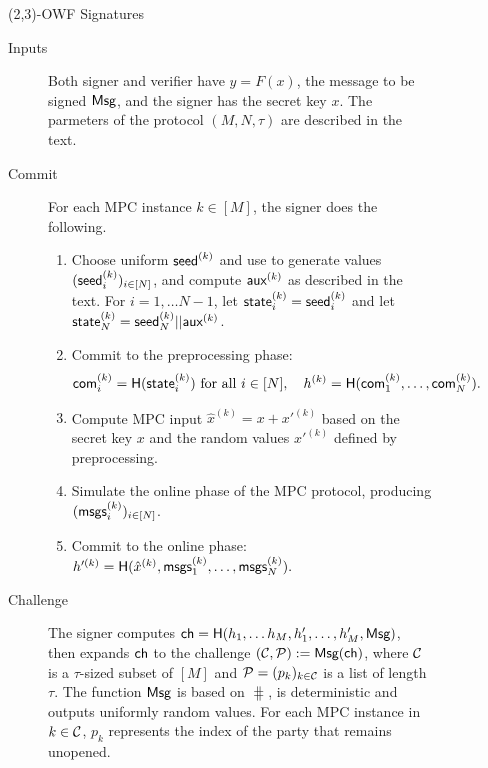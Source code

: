 \begin{figure}[p]
 \begin{minipage}[t]{1.1\textwidth}
 \begin{protocolbox}{(2,3)-OWF Signatures}
 \begin{description}
    \item[Inputs] Both signer and verifier have $y = F(x)$, the
        message to be signed $\textsf{Msg}$, and the signer has the secret key $x$.  The
            parmeters of the protocol $(M, N, \tau)$ are described in the text.
    \item[Commit] For each MPC instance $k\in[M]$, the signer does the following.
    \begin{enumerate}
        \item Choose uniform $\textsf{seed}^{(k)}$ and use  to generate values $(\textsf{seed}^{(k)}_i)_{i \in [N]}$, and compute  
        $\textsf{aux}^{(k)}$ as described in the text. 
        For $i=1,\ldots N-1$, let $\textsf{state}^{(k)}_i = \textsf{seed}^{(k)}_i$ and  let $\textsf{state}^{(k)}_{N} = \textsf{seed}^{(k)}_{N} || \textsf{aux}^{(k)}$.
        \item Commit to the preprocessing phase:
        \begin{align*}
        \textsf{com}^{(k)}_{i} = \textsf{H}(\textsf{state}^{(k)}_i) \text{ for all } i\in [N], \quad 
        h^{(k)} = \textsf{H}(\textsf{com}^{(k)}_{1},\ldots,\textsf{com}^{(k)}_{N}).
        \end{align*}						
        \item Compute MPC input $\hat{x}^{(k)} = x + x'^{(k)}$ based on the secret key $x$ and the random values $x'^(k)$ defined by preprocessing.
        \item Simulate the online phase of the MPC protocol, producing $(\textsf{msgs}^{(k)}_i)_{i \in [N]}$.			
        \item Commit to the online phase:
        $
         h'^{(k)}= \textsf{H}(\hat{x}^{(k)}, \textsf{msgs}_{1}^{(k)}, \ldots, \textsf{msgs}_{N}^{(k)} ).
        $
    \end{enumerate}
    
    \item[Challenge] 
    The signer computes $\textsf{ch} = \textsf{H}(h_1, \ldots h_M, h_1', \ldots, h_M',
    \textsf{Msg})$, then expands $\textsf{ch}$ to the challenge $(\mathcal{C}, \mathcal{P}) := \textsf{Msg}(\textsf{ch})$,
    where $\mathcal{C}$ is a $\tau$-sized subset of $[M]$ and $\mathcal{P} = (p_k)_{k \in
    \mathcal{C}}$ is a list of length $\tau$.  The function $\textsf{Msg}$ is based on $\hash$, is deterministic and
    outputs uniformly random values. 
    For each MPC instance in $k\in\mathcal{C}$, $p_k$ represents the index of the party that remains unopened. 
    

\end{description}
\end{protocolbox}
\end{minipage}
\end{figure}
